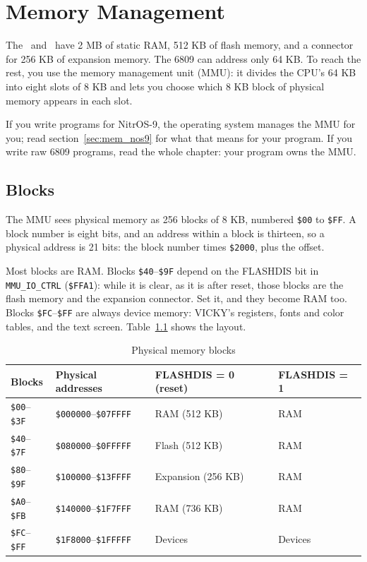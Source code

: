 \chapter{Memory Management}
\label{chp:memory}

The \jrtwo\ and \ktwo\ have 2 MB of static RAM, 512 KB of flash memory, and a connector for 256 KB of expansion memory. The 6809 can address only 64 KB. To reach the rest, you use the memory management unit (MMU): it divides the CPU's 64 KB into eight slots of 8 KB and lets you choose which 8 KB block of physical memory appears in each slot.

If you write programs for NitrOS-9, the operating system manages the MMU for you; read section~\ref{sec:mem_nos9} for what that means for your program. If you write raw 6809 programs, read the whole chapter: your program owns the MMU.

\section{Blocks}

The MMU sees physical memory as 256 blocks of 8 KB, numbered \verb+$00+ to \verb+$FF+. A block number is eight bits, and an address within a block is thirteen, so a physical address is 21 bits: the block number times \verb+$2000+, plus the offset.

Most blocks are RAM. Blocks \verb+$40+--\verb+$9F+ depend on the FLASHDIS bit in \verb+MMU_IO_CTRL+ (\verb+$FFA1+): while it is clear, as it is after reset, those blocks are the flash memory and the expansion connector. Set it, and they become RAM too. Blocks \verb+$FC+--\verb+$FF+ are always device memory: VICKY's registers, fonts and color tables, and the text screen. Table~\ref{tab:phys_blocks} shows the layout.

\begin{table}[ht]
    \begin{center}
        \begin{tabular}{|l|l|l|l|} \hline
            Blocks & Physical addresses & FLASHDIS = 0 (reset) & FLASHDIS = 1 \\ \hline\hline
            \verb+$00+--\verb+$3F+ & \verb+$000000+--\verb+$07FFFF+ & RAM (512 KB) & RAM \\ \hline
            \verb+$40+--\verb+$7F+ & \verb+$080000+--\verb+$0FFFFF+ & Flash (512 KB) & RAM \\ \hline
            \verb+$80+--\verb+$9F+ & \verb+$100000+--\verb+$13FFFF+ & Expansion (256 KB) & RAM \\ \hline
            \verb+$A0+--\verb+$FB+ & \verb+$140000+--\verb+$1F7FFF+ & RAM (736 KB) & RAM \\ \hline
            \verb+$FC+--\verb+$FF+ & \verb+$1F8000+--\verb+$1FFFFF+ & Devices & Devices \\ \hline
        \end{tabular}
    \end{center}
    \caption{Physical memory blocks}
    \label{tab:phys_blocks}
\end{table}

